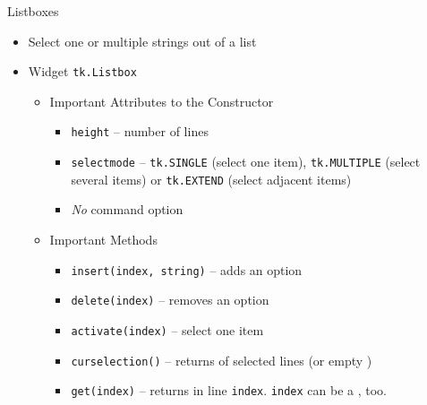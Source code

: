 \begin{frame}[fragile]{Listboxes}
%
\begin{itemize}
\item Select one or multiple strings out of a list
\item Widget \texttt{tk.Listbox}
	\begin{itemize}
	\item Important Attributes to the Constructor
		\begin{itemize}
		\item \texttt{height} -- number of lines
		\item \texttt{selectmode} -- \texttt{tk.SINGLE} (select one item), \texttt{tk.MULTIPLE} (select several items) or \texttt{tk.EXTEND} (select adjacent items)
		\item \emph{No} command option
		\end{itemize}
	\item Important Methods 
		\begin{itemize}
		\item \texttt{insert(index, string)} -- adds an option
		\item \texttt{delete(index)} -- removes an option
		\item \texttt{activate(index)} -- select one item
		\item \texttt{curselection()} -- returns  of selected lines (or empty )
		\item \texttt{get(index)} -- returns in line \texttt{index}. \texttt{index} can be a , too.
		\end{itemize}
	\end{itemize}
\end{itemize}
%
\end{frame}


